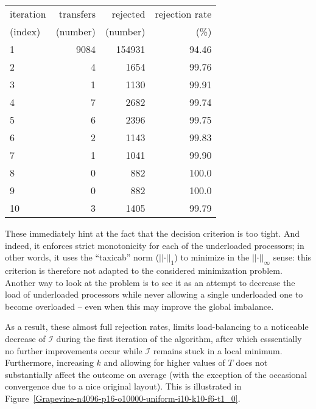 \begin{center}
\begin{tabular}{lrrr}
\hline
iteration & transfers & rejected & rejection rate\\
(index)   & (number)  & (number) & (\%)\\
\hline\hline
 1 & 9084 & 154931 & 94.46\\
 2 &    4 &   1654 & 99.76\\
 3 &    1 &   1130 & 99.91\\
 4 &    7 &   2682 & 99.74\\
 5 &    6 &   2396 & 99.75\\
 6 &    2 &   1143 & 99.83\\
 7 &    1 &   1041 & 99.90\\
 8 &    0 &    882 & 100.0\\
 9 &    0 &    882 & 100.0\\
10 &    3 &   1405 & 99.79\\
\hline
\end{tabular}
\end{center}
These immediately hint at the fact that the decision criterion is too
tight. And indeed, it enforces strict monotonicity for each of the
underloaded processors; in other words, it uses the ``taxicab'' norm
($\vert\vert\cdot\vert\vert_1$) to minimize in the
$\vert\vert\cdot\vert\vert_\infty$ sense: this criterion is therefore
not adapted to the considered minimization problem.
Another way to look at the problem is to see it as an attempt to
decrease the load of underloaded processors while never allowing a
single underloaded one to become overloaded -- even when this may
improve the global imbalance.

As a result, these almost full rejection rates, limits load-balancing
to a noticeable decrease of $\mathcal{I}$ during the
first iteration of the algorithm, after which esssentially no further
improvements occur while $\mathcal{I}$ remains stuck in a local
minimum. Furthermore, increasing $k$ and allowing for higher values of
$T$ does not substantially affect the outcome on average (with the
exception of the occasional convergence due to a nice original layout).
This is illustrated in
Figure~\ref{Grapevine-n4096-p16-o10000-uniform-i10-k10-f6-t1_0}.




